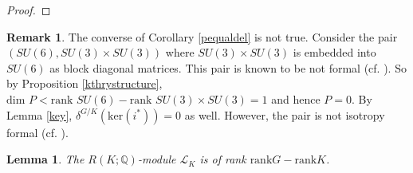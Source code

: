 \documentclass[11pt]{amsart}
\theoremstyle{plain}
\newtheorem{lemma}[theorem]{Lemma}
\theoremstyle{definition}
\newtheorem{remark}[theorem]{Remark}
\begin{document}
\begin{proof}
\end{proof}
\begin{remark}
The converse of Corollary \ref{pequaldel} is not true. Consider the pair $(SU(6), SU(3)\times SU(3))$ where $SU(3)\times SU(3)$ is embedded into $SU(6)$ as block diagonal matrices. This pair is known to be not formal (cf. \cite[pp. 486--488]{GHV}). So by Proposition \ref{kthrystructure}, $\text{dim }P<\text{rank }SU(6)-\text{rank }SU(3)\times SU(3)=1$ and hence $P=0$. By Lemma \ref{key}, $\delta^{G/K}(\text{ker}(i^*))=0$ as well. However, the pair is not isotropy formal (cf. \cite[Example 3.5]{CFok}).
\end{remark}
\begin{lemma}
	The $R(K; \mathbb{Q})$-module $\mathcal{L}_K$ is of rank $\text{rank}G-\text{rank}K$.
\end{lemma}
\end{document}
